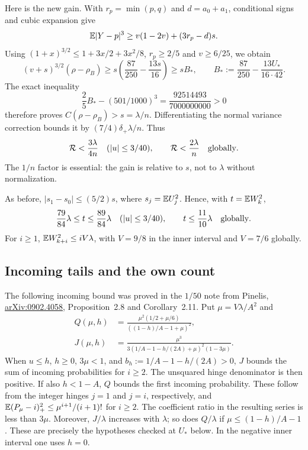 Here is the new gain. With $r_p=\min(p,q)$ and $d=a_0+a_1$,
conditional signs and cubic expansion give
\[
 \mathbb E|Y-p|^3\ge v(1-2v)+(3r_p-d)s.
\]
Using $(1+x)^{3/2}\le1+3x/2+3x^2/8$, $r_p\ge2/5$ and
$v\ge6/25$, we obtain
\begin{equation}\label{v11:counts:gain}
 (v+s)^{3/2}(\rho-\rho_B)
 \ge s\left(\frac{87}{250}-\frac{13s}{16}\right)
 \ge s B_*,\qquad
 B_*:=\frac{87}{250}-\frac{13U_*}{16\cdot42}.
\end{equation}
The exact inequality
\[
 \frac25 B_*-(501/1000)^3
                 =\frac{92514493}{7000000000}>0
\]
therefore proves $C(\rho-\rho_B)>s=\lambda/n$. Differentiating
the normal variance correction bounds it by
$(7/4)\delta_+\lambda/n$. Thus
\begin{equation}\label{v11:counts:repair}
 \mathcal R<\frac{3\lambda}{4n}\quad(|u|\le3/40),
 \qquad \mathcal R<\frac{2\lambda}{n}\quad\hbox{globally}.
\end{equation}
The $1/n$ factor is essential: the gain is relative to $s$, not to
$\lambda$ without normalization.

As before, $|s_1-s_0|\le(5/2)s$, where $s_j=\mathbb E U_j^2$.
Hence, with $t=\mathbb E W_k^2$,
\[
 \frac{79}{84}\lambda\le t\le\frac{89}{84}\lambda
     \quad(|u|\le3/40),\qquad t\le\frac{11}{10}\lambda
     \quad\hbox{globally}.
\]
For $i\ge1$, $\mathbb E W_{k+i}^2\le iV\lambda$, with $V=9/8$ in
the inner interval and $V=7/6$ globally.

\subsection{Incoming tails and the own count}
The following incoming bound was proved in the $1/50$ note from
Pinelis, \href{https://arxiv.org/abs/0902.4058}{arXiv:0902.4058},
Proposition~2.8 and Corollary~2.11. Put $\mu=V\lambda/A^2$ and
\[
 \begin{split}
 Q(\mu,h)&=\frac{\mu^2(1/2+\mu/6)}{((1-h)/A-1+\mu)^2},\\
 J(\mu,h)&=\frac{\mu^3}
 {3(1/A-1-h/(2A)+\mu)^2(1-3\mu)}.
 \end{split}
\]
When $u\le h$, $h\ge0$, $3\mu<1$, and
$b_h:=1/A-1-h/(2A)>0$, $J$ bounds the sum of incoming
probabilities for $i\ge2$. The unsquared hinge denominator is then positive.
If also $h<1-A$, $Q$ bounds the first incoming probability. These
follow from the integer hinges $j=1$ and $j=i$, respectively, and
$\mathbb E(P_\mu-i)_+^2\le\mu^{i+1}/(i+1)!$ for $i\ge2$.
The coefficient ratio in the resulting series is less than $3\mu$.
Moreover, $J/\lambda$ increases with $\lambda$; so does $Q/\lambda$
if $\mu\le(1-h)/A-1$. These are precisely the hypotheses checked
at $U_*$ below. In the negative inner interval one uses $h=0$.


